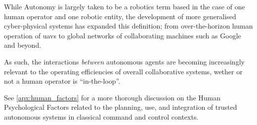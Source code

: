 While Autonomy is largely taken to be a robotics term based in the case of one human operator and one robotic entity, the development of more generalised cyber-physical systems has expanded this definition; from over-the-horizon human operation of \glspl{uav} to global networks of collaborating machines such as Google and beyond.

As such, the interactions \emph{between} autonomous agents are becoming increasingly relevant to the operating efficiencies of overall collaborative systems, wether or not a human operator is ``in-the-loop''.

See \autoref{apx:human_factors} for a more thorough discussion on the Human Psychological Factors related to the planning, use, and integration of trusted autonomous systems in classical command and control contexts.



